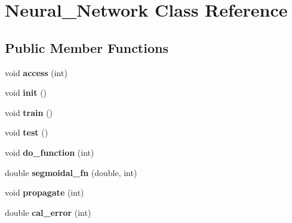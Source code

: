 \hypertarget{classNeural__Network}{\section{Neural\-\_\-\-Network Class Reference}
\label{classNeural__Network}
}
\subsection*{Public Member Functions}
\begin{DoxyCompactItemize}
\item 
\hypertarget{classNeural__Network_aed9a3037441f5c7a44d3f36d4e62deed}{void {\bfseries access} (int)}\label{classNeural__Network_aed9a3037441f5c7a44d3f36d4e62deed}

\item 
\hypertarget{classNeural__Network_ac86567c994bb671c20ed50316d268d3b}{void {\bfseries init} ()}\label{classNeural__Network_ac86567c994bb671c20ed50316d268d3b}

\item 
\hypertarget{classNeural__Network_a033f4f60812c0359cc50815e957f11f7}{void {\bfseries train} ()}\label{classNeural__Network_a033f4f60812c0359cc50815e957f11f7}

\item 
\hypertarget{classNeural__Network_a38193cc61e9affbd077c1c6089fd0889}{void {\bfseries test} ()}\label{classNeural__Network_a38193cc61e9affbd077c1c6089fd0889}

\item 
\hypertarget{classNeural__Network_acd3d4762d71d54422b45fda3a13976cf}{void {\bfseries do\-\_\-function} (int)}\label{classNeural__Network_acd3d4762d71d54422b45fda3a13976cf}

\item 
\hypertarget{classNeural__Network_a7a8eff736645e4101ed906a46e6a27ac}{double {\bfseries segmoidal\-\_\-fn} (double, int)}\label{classNeural__Network_a7a8eff736645e4101ed906a46e6a27ac}

\item 
\hypertarget{classNeural__Network_aa7a5737152daab632fcd8a8863dd2af3}{void {\bfseries propagate} (int)}\label{classNeural__Network_aa7a5737152daab632fcd8a8863dd2af3}

\item 
\hypertarget{classNeural__Network_a27bbf05738959d82fb8b3c4667a6dd3d}{double {\bfseries cal\-\_\-error} (int)}\label{classNeural__Network_a27bbf05738959d82fb8b3c4667a6dd3d}


\end{DoxyCompactItemize}
